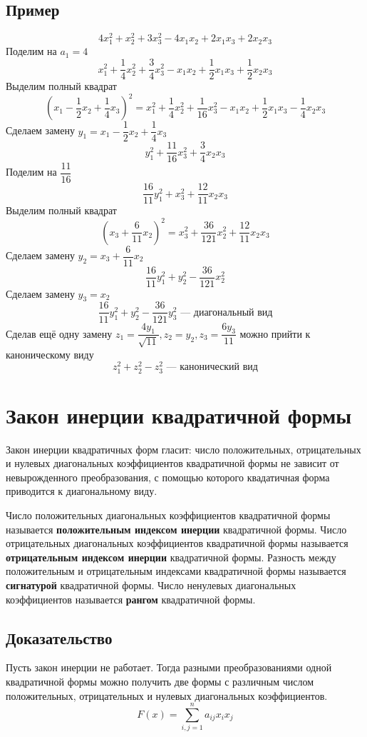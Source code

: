 \documentclass[12pt]{article}
\begin{document}
\subsection{Пример}
\[
    4x_1^2 + x_2^2 + 3x_3^2 - 4x_1x_2 + 2x_1x_3 + 2x_2x_3
\]
Поделим на $a_1 = 4$
\[
    x_1^2 + \dfrac{1}{4}x_2^2 + \dfrac{3}{4}x_3^2 - x_1x_2 + \dfrac{1}{2}x_1x_3 + \dfrac{1}{2}x_2x_3
\]
Выделим полный квадрат
\[
    (x_1 - \dfrac{1}{2}x_2 + \dfrac{1}{4}x_3)^2 = x_1^2 + \dfrac{1}{4}x_2^2 + \dfrac{1}{16}x_3^2 - x_1x_2 + \dfrac{1}{2}x_1x_3 - \dfrac{1}{4}x_2x_3
\]
Сделаем замену  $y_1 = x_1 - \dfrac{1}{2}x_2 + \dfrac{1}{4}x_3$
\[
    y_1^2 + \dfrac{11}{16}x_3^2 + \dfrac{3}{4}x_2x_3
\]
Поделим на $\dfrac{11}{16}$
\[
    \dfrac{16}{11}y_1^2 + x_3^2 + \dfrac{12}{11}x_2x_3
\]
Выделим полный квадрат
\[
    (x_3 + \dfrac{6}{11}x_2)^2 = x_3^2 + \dfrac{36}{121}x_2^2 + \dfrac{12}{11}x_2x_3
\]
Сделаем замену $y_2 = x_3 + \dfrac{6}{11}x_2$
\[
    \dfrac{16}{11}y_1^2 + y_2^2 - \dfrac{36}{121}x_2^2
\]
Сделаем замену $y_3 = x_2$
\[
    \dfrac{16}{11}y_1^2 + y_2^2 - \dfrac{36}{121}y_3^2 \text{ — диагональный вид}
\]
Сделав ещё одну замену $z_1 = \dfrac{4y_1}{\sqrt{11}}, z_2 = y_2, z_3 = \dfrac{6y_3}{11}$ можно прийти к каноническому виду
\[
    z_1^2 + z_2^2 - z_3^2 \text{ — канонический вид}
\]

\section{Закон инерции квадратичной формы}
Закон инерции квадратичных форм гласит: число положительных, отрицательных и нулевых диагональных коэффициентов квадратичной формы не зависит от невырожденного преобразования, с помощью которого квадатичная форма приводится к диагональному виду.

Число положительных диагональных коэффициентов квадратичной формы называется \textbf{положительным индексом инерции} квадратичной формы. Число отрицательных диагональных коэффициентов квадратичной формы называется \textbf{отрицательным индексом инерции} квадратичной формы. Разность между положительным и отрицательным индексами квадратичной формы называется \textbf{сигнатурой} квадратичной формы. Число ненулевых диагональных коэффициентов называется \textbf{рангом} квадратичной формы.

\subsection{Доказательство}
Пусть закон инерции не работает. Тогда разными преобразованиями одной квадратичной формы можно получить две формы с различным числом положительных, отрицательных и нулевых диагональных коэффициентов.
\[
    F(x) = \sum^n_{i,j=1}a_{ij}x_ix_j
\]
\end{document}
